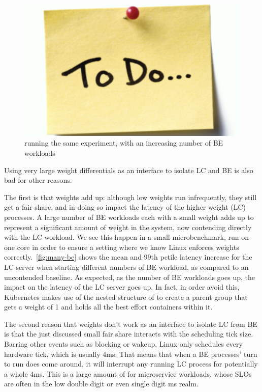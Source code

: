 \begin{figure}[t]
    \centering
    \includegraphics[width=0.8\columnwidth]{graphs/todo.png}
    \caption{running the same experiment, with an increasing number of BE
    workloads}\label{fig:many-be}
\end{figure}

Using very large weight differentials as an interface to isolate LC and BE is
also bad for other reasons.

The first is that weights add up: although low weights run infrequently, they
still get a fair share, and in doing so impact the latency of the higher weight
(LC) processes. A large number of BE workloads each with a small weight adds up
to represent a significant amount of weight in the system, now contending
directly with the LC workload. We see this happen in a small microbenchmark, run
on one core in order to ensure a setting where we know Linux enforces weights
correctly.~\autoref{fig:many-be} shows the mean and 99th pctile latency increase
for the LC server when starting different numbers of BE workload, as compared to
an uncontended baseline. As expected, as the number of BE workloads goes up, the
impact on the latency of the LC server goes up. In fact, in order avoid this,
Kubernetes makes use of the nested structure of \cgroups{} to create a parent
group that gets a weight of 1 and holds all the best effort containers within
it.

The second reason that weights don't work as an interface to isolate LC from BE
is that the just discussed small fair share interacts with the scheduling tick
size. Barring other events such as blocking or wakeup, Linux only schedules
every hardware tick, which is usually 4ms. That means that when a BE processes'
turn to run does come around, it will interrupt any running LC process for
potentially a whole 4ms. This is a large amount of for microservice workloads,
whose SLOs are often in the low double digit or even single digit ms
realm.~\cite{TODO}




